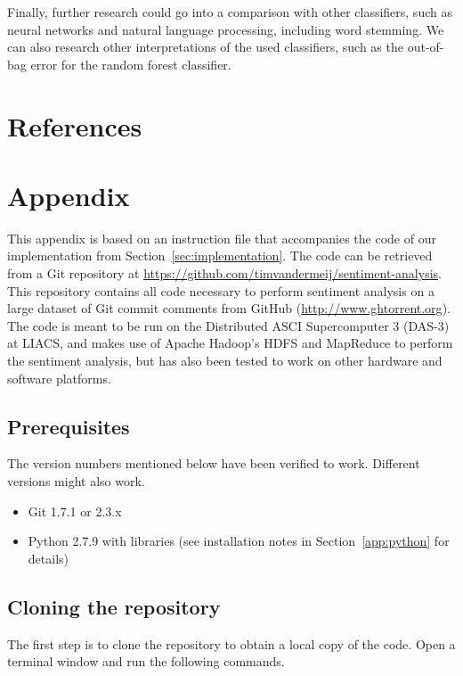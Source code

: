 \documentclass{article}
\begin{document}
Finally, further research could go into a comparison with other classifiers,
such as neural networks and natural language processing, including word 
stemming. We can also research other interpretations of the used classifiers, 
such as the out-of-bag error for the random forest classifier.

\section{References}\label{sec:references}
\printbibliography[heading=none]

\appendix
\section{Appendix}\label{app:appendix}
This appendix is based on an instruction file that accompanies the 
code of our implementation from Section~\ref{sec:implementation}. The code can 
be retrieved from a Git repository at 
\url{https://github.com/timvandermeij/sentiment-analysis}. This repository 
contains all code necessary to perform sentiment analysis on a large dataset of 
Git commit comments from GitHub (\url{http://www.ghtorrent.org}). The code is 
meant to be run on the Distributed ASCI Supercomputer 3 (DAS-3) at LIACS, and 
makes use of Apache Hadoop's HDFS and MapReduce to perform the sentiment 
analysis, but has also been tested to work on other hardware and software 
platforms.

\subsection{Prerequisites}\label{app:prerequisities}
The version numbers mentioned below have been verified to work. Different
versions might also work.

\begin{itemize}
  \item Git 1.7.1 or 2.3.x
  \item Python 2.7.9 with libraries (see installation notes in 
    Section~\ref{app:python} for details)
\end{itemize}

\subsection{Cloning the repository}\label{app:cloning-the-repository}
The first step is to clone the repository to obtain a local copy of the code. 
Open a terminal window and run the following commands.
\end{document}
